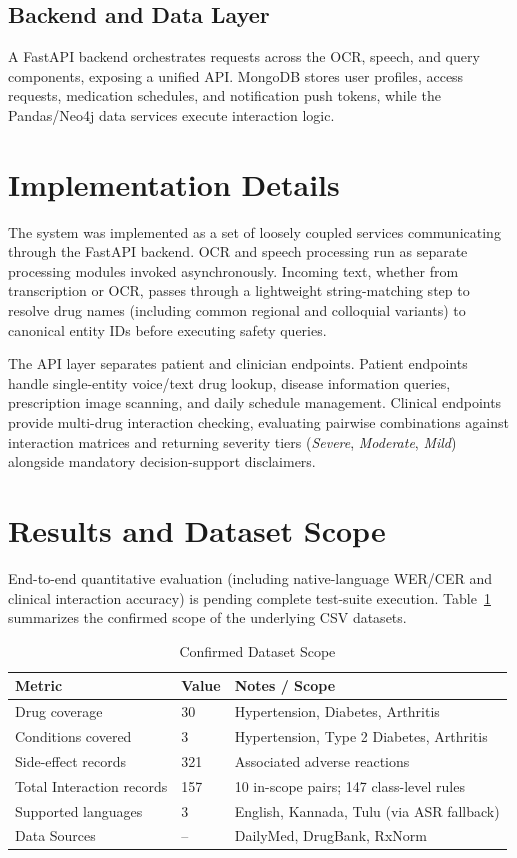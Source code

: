 \documentclass[9pt,journal,twoside,web]{ieeecolor}
\begin{document}
\subsection{Backend and Data Layer}
A FastAPI backend orchestrates requests across the OCR, speech, and query components, exposing a unified API. MongoDB stores user profiles, access requests, medication schedules, and notification push tokens, while the Pandas/Neo4j data services execute interaction logic.

\section{Implementation Details}
\label{sec:implementation}
The system was implemented as a set of loosely coupled services communicating through the FastAPI backend. OCR and speech processing run as separate processing modules invoked asynchronously. Incoming text, whether from transcription or OCR, passes through a lightweight string-matching step to resolve drug names (including common regional and colloquial variants) to canonical entity IDs before executing safety queries.

The API layer separates patient and clinician endpoints. Patient endpoints handle single-entity voice/text drug lookup, disease information queries, prescription image scanning, and daily schedule management. Clinical endpoints provide multi-drug interaction checking, evaluating pairwise combinations against interaction matrices and returning severity tiers (\textit{Severe}, \textit{Moderate}, \textit{Mild}) alongside mandatory decision-support disclaimers.

\section{Results and Dataset Scope}
\label{sec:results}
End-to-end quantitative evaluation (including native-language WER/CER and clinical interaction accuracy) is pending complete test-suite execution. Table~\ref{tab:results} summarizes the confirmed scope of the underlying CSV datasets.

\begin{table}[!h]
\caption{Confirmed Dataset Scope}
\label{tab:results}
\centering
\footnotesize
\setlength{\tabcolsep}{3pt}
\begin{tabular}{|p{80pt}|p{30pt}|p{105pt}|}
\hline
\textbf{Metric} & \textbf{Value} & \textbf{Notes / Scope} \\
\hline
Drug coverage & 30 & Hypertension, Diabetes, Arthritis \\
\hline
Conditions covered & 3 & Hypertension, Type 2 Diabetes, Arthritis \\
\hline
Side-effect records & 321 & Associated adverse reactions \\
\hline
Total Interaction records & 157 & 10 in-scope pairs; 147 class-level rules \\
\hline
Supported languages & 3 & English, Kannada, Tulu (via ASR fallback) \\
\hline
Data Sources & -- & DailyMed, DrugBank, RxNorm \\
\hline
\end{tabular}
\end{table}
\end{document}
